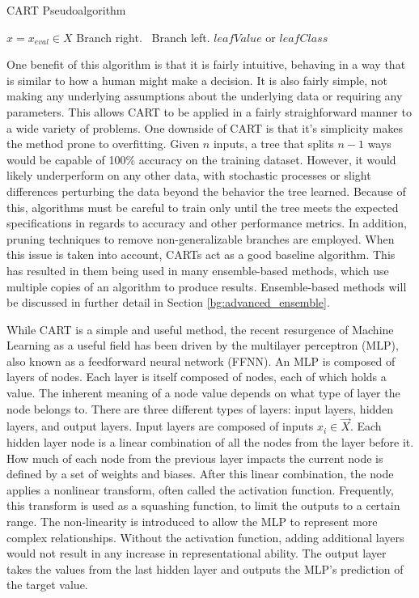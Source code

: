 	\begin{algorithm}[ht]
		\caption{CART Pseudoalgorithm}
		\label{code:bg_cart}
		\begin{algorithmic}[1]
			\State $x = x_{eval} \in X$
			 Branch right.
			\Else \ Branch left.
			\EndIf
			\EndWhile
			\State \Return $leafValue$ or $leafClass$
			\EndProcedure
		\end{algorithmic}
	\end{algorithm}
	\par One benefit of this algorithm is that it is fairly intuitive, behaving in a way that is similar to how a human might make a decision. It is also fairly simple, not making any underlying assumptions about the underlying data or requiring any parameters. This allows CART to be applied in a fairly straighforward manner to a wide variety of problems. One downside of CART is that it's simplicity makes the method prone to overfitting. Given $n$ inputs, a tree that splits $n-1$ ways would be capable of 100\% accuracy on the training dataset. However, it would likely underperform on any other data, with stochastic processes or slight differences perturbing the data beyond the behavior the tree learned. Because of this, algorithms must be careful to train only until the tree meets the expected specifications in regards to accuracy and other performance metrics. In addition, pruning techniques to remove non-generalizable branches are employed. When this issue is taken into account, CARTs act as a good baseline algorithm. This has resulted in them being used in many ensemble-based methods, which use multiple copies of an algorithm to produce results. Ensemble-based methods will be discussed in further detail in Section \ref{bg:advanced_ensemble}.
	
	\par While CART is a simple and useful method, the recent resurgence of Machine Learning as a useful field has been driven by the multilayer perceptron (MLP), also known as a feedforward neural network (FFNN). An MLP is composed of layers of nodes. Each layer is itself composed of nodes, each of which holds a value. The inherent meaning of a node value depends on what type of layer the node belongs to. There are three different types of layers: input layers, hidden layers, and output layers. Input layers are composed of inputs $x_i \in \vec{X}$. Each hidden layer node is a linear combination of all the nodes from the layer before it. How much of each node from the previous layer impacts the current node is defined by a set of weights and biases. After this linear combination, the node applies a nonlinear transform, often called the activation function. Frequently, this transform is used as a squashing function, to limit the outputs to a certain range. The non-linearity is introduced to allow the MLP to represent more complex relationships. Without the activation function, adding additional layers would not result in any increase in representational ability. The output layer takes the values from the last hidden layer and outputs the MLP's prediction of the target value. 
	 
